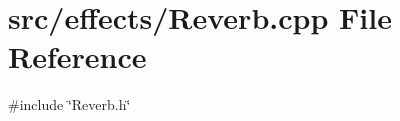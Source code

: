 \section{src/effects/\+Reverb.cpp File Reference}
\label{_reverb_8cpp}
{\ttfamily \#include \char`\"{}Reverb.\+h\char`\"{}}\newline
